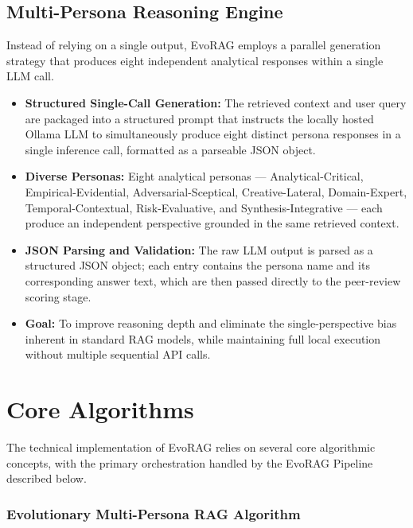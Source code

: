 \subsection{Multi-Persona Reasoning Engine}

Instead of relying on a single output, EvoRAG employs a parallel generation strategy that produces eight independent analytical responses within a single LLM call.

\begin{itemize}
    \item \textbf{Structured Single-Call Generation:} The retrieved context and user query are packaged into a structured prompt that instructs the locally hosted Ollama LLM to simultaneously produce eight distinct persona responses in a single inference call, formatted as a parseable JSON object.
    \item \textbf{Diverse Personas:} Eight analytical personas — Analytical-Critical, Empirical-Evidential, Adversarial-Sceptical, Creative-Lateral, Domain-Expert, Temporal-Contextual, Risk-Evaluative, and Synthesis-Integrative — each produce an independent perspective grounded in the same retrieved context.
    \item \textbf{JSON Parsing and Validation:} The raw LLM output is parsed as a structured JSON object; each entry contains the persona name and its corresponding answer text, which are then passed directly to the peer-review scoring stage.
    \item \textbf{Goal:} To improve reasoning depth and eliminate the single-perspective bias inherent in standard RAG models, while maintaining full local execution without multiple sequential API calls.
\end{itemize}

\clearpage

\section{Core Algorithms}

The technical implementation of EvoRAG relies on several core algorithmic concepts,
with the primary orchestration handled by the EvoRAG Pipeline described below.

\subsubsection{Evolutionary Multi-Persona RAG Algorithm}

\vspace{0.5em}

